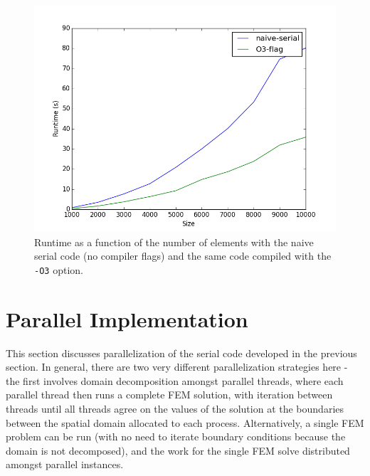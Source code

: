 \documentclass[10pt]{article}
\begin{document}
\begin{figure}[H]
\centering
\includegraphics[width=0.6\linewidth]{../figures/O3-flag.png}
\caption{Runtime as a function of the number of elements with the naive serial code (no compiler flags) and the same code compiled with the {\tt -O3} option.}
\end{figure}

\section{Parallel Implementation}
This section discusses parallelization of the serial code developed in the previous section. In general, there are two very different parallelization strategies here - the first involves domain decomposition amongst parallel threads, where each parallel thread then runs a complete FEM solution, with iteration between threads until all threads agree on the values of the solution at the boundaries between the spatial domain allocated to each process. Alternatively, a single FEM problem can be run (with no need to iterate boundary conditions because the domain is not decomposed), and the work for the single FEM solve distributed amongst parallel instances.
\end{document}
